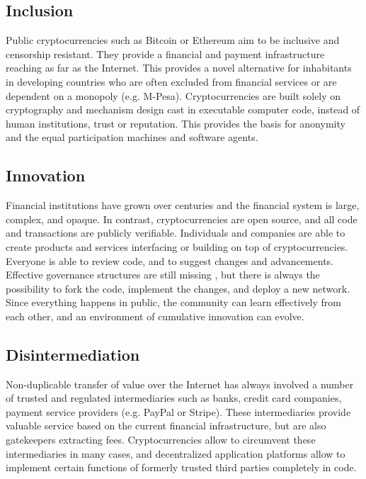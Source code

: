 \subsection{Inclusion}

Public cryptocurrencies such as Bitcoin or Ethereum aim to be inclusive and censorship resistant. They provide a financial and payment infrastructure reaching as far as the Internet. This provides a novel alternative for inhabitants in developing countries who are often excluded from financial services \parencite{chaia2010counting} or are dependent on a monopoly (e.g. M-Pesa). Cryptocurrencies are built solely on cryptography and mechanism design cast in executable computer code, instead of human institutions, trust or reputation. This provides the basis for anonymity and the equal participation machines and software agents. 

\subsection{Innovation}

Financial institutions have grown over centuries and the financial system is large, complex, and opaque. In contrast, cryptocurrencies are open source, and all code and transactions are publicly verifiable. Individuals and companies are able to create products and services interfacing or building on top of cryptocurrencies. Everyone is able to review code, and to suggest changes and advancements. Effective governance structures are still missing \parencite{Narayanan2015}, but there is always the possibility to fork the code, implement the changes, and deploy a new network. Since everything happens in public, the community can learn effectively from each other, and an environment of cumulative innovation can evolve. 

\subsection{Disintermediation}

Non-duplicable transfer of value over the Internet has always involved a number of trusted and regulated intermediaries such as banks, credit card companies, payment service providers (e.g. PayPal or Stripe). These intermediaries provide valuable service based on the current financial infrastructure, but are also gatekeepers extracting fees. Cryptocurrencies allow to circumvent these intermediaries in many cases, and decentralized application platforms allow to implement certain functions of formerly trusted third parties completely in code. 

